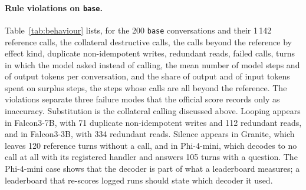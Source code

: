 \documentclass{article}
\newcommand{\cls}[1]{\texttt{#1}}
\begin{document}
\paragraph{Rule violations on \cls{base}.} Table~\ref{tab:behaviour} lists, for the 200 \cls{base} conversations and their
1\,142 reference calls, the collateral destructive calls, the calls beyond the reference by effect kind, duplicate
non-idempotent writes, redundant reads, failed calls, turns in which the model asked instead of calling, the mean number
of model steps and of output tokens per conversation, and the share of output and of input tokens spent on surplus steps,
the steps whose calls are all beyond the reference. The violations separate three failure modes that the official score records only as inaccuracy. Substitution is the collateral calling
discussed above. Looping appears in Falcon3-7B, with 71 duplicate non-idempotent writes and 112 redundant reads, and in
Falcon3-3B, with 334 redundant reads. Silence appears in Granite, which leaves 120 reference turns without a call, and in
Phi-4-mini, which decodes to no call at all with its registered handler and answers 105 turns with a question. The
Phi-4-mini case shows that the decoder is part of what a leaderboard measures; a leaderboard that re-scores logged runs
should state which decoder it used.
\end{document}
